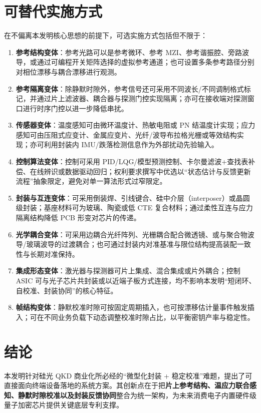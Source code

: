 \documentclass[12pt,a4paper]{article}
\begin{document}
\section{可替代实施方式}

在不偏离本发明核心思想的前提下，可选实施方式包括但不限于：
\begin{enumerate}[label=(\arabic*)]
    \item \textbf{参考结构变体}：参考光路可以是参考微环、参考 MZI、参考谐振腔、旁路波导，或通过可编程开关矩阵选择的虚拟参考通道；也可设置多条参考路径分别对相位漂移与耦合漂移进行观测。
    \item \textbf{参考隔离变体}：除静默时隙外，参考信号还可采用不同波长/不同调制格式标记，并通过片上滤波器、耦合器与探测门控实现隔离；亦可在接收端对探测窗口进行时序门控以进一步降低串扰。
    \item \textbf{传感器变体}：温度感知可由微环温度计、热敏电阻或 PN 结温度计实现；应力感知可由压阻式应变计、金属应变片、光纤/波导布拉格光栅或等效结构实现；亦可利用封装内 IMU/跌落检测信息作为外部扰动先验输入。
    \item \textbf{控制算法变体}：控制可采用 PID/LQG/模型预测控制、卡尔曼滤波+查找表补偿、在线辨识或数据驱动回归；权利要求撰写中优选以“状态估计与反馈更新流程”抽象限定，避免对单一算法形式过窄限定。
    \item \textbf{封装与互连变体}：可采用倒装焊、引线键合、硅中介层（interposer）或晶圆级封装；基座材料可为玻璃、陶瓷或低 CTE 复合材料；通过柔性互连与应力隔离结构降低 PCB 形变对芯片的传递。
    \item \textbf{光学耦合变体}：可采用边耦合光纤阵列、光栅耦合配合微透镜、或与聚合物波导/玻璃波导的过渡耦合；也可通过封装内对准基准与限位结构提高装配一致性与长期对准保持。
    \item \textbf{集成形态变体}：激光器与探测器可片上集成、混合集成或片外耦合；控制 ASIC 可与光子芯片共封装或以近端子板方式连接，均不影响本发明“短闭环、自校准、封装协同”的核心特征。
    \item \textbf{帧结构变体}：静默校准时隙可按固定周期插入，也可按漂移估计量事件触发插入；可在不同业务负载下动态调整校准时隙占比，以平衡密钥产率与稳定性。
\end{enumerate}

\section{结论}

本发明针对硅光 QKD 商业化所必经的“微型化封装 + 稳定校准”难题，提出了可直接面向终端设备落地的系统方案。其创新点在于把\textbf{片上参考结构、温应力联合感知、静默时隙校准以及封装反馈协同}整合为统一架构，为未来消费电子内置硬件级量子加密芯片提供关键底层专利支撑。
\end{document}
